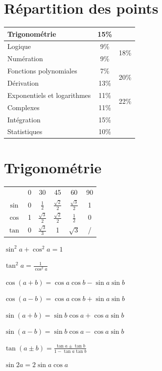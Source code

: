 \documentclass[a4paper,12pt]{article}
\begin{document}
\section*{Répartition des points}
\begin{tabular}{lcc} 
    Trigonométrie & 15\% & \\ \hline
    Logique & 9\% &  \multirow{2}{*}{18\%} \\
    Numération & 9\% & \\ \hline
    Fonctions polynomiales & 7\% &  \multirow{2}{*}{20\%} \\
    Dérivation & 13\% &  \\ \hline
     Exponentiels et logarithmes & 11\% &  \multirow{2}{*}{22\%} \\
    Complexes & 11\% &  \\ \hline
    Intégration & 15\% &  \\ \hline
    Statistiques & 10\% & \\
\end{tabular}

\newpage
\section{Trigonométrie}

\begin{tabular}{cccccc}
   & 0 & 30 & 45 & 60 & 90 \\
  $\sin$ & 0 & $\frac{1}{2}$ & $\frac{\sqrt{2}}{2}$ & $\frac{\sqrt{3}}{2}$ & 1\\
  $\cos$ & 1 & $\frac{\sqrt{3}}{2}$ & $\frac{\sqrt{2}}{2}$ & $\frac{1}{2}$ & 0 \\
  $\tan$ & 0 & $\frac{\sqrt{3}}{3}$ & 1 & $\sqrt{3}$ & / \\
\end{tabular}

\vspace{\baselineskip}
$\sin^2 a + \cos^2 a = 1$

$\tan^2a = \frac{1}{\cos^2a}$

\vspace{\baselineskip}
$\cos(a+b)= \cos a \cos b - \sin a \sin b$

$\cos(a-b)= \cos a \cos b + \sin a \sin b$

$\sin(a+b)= \sin b \cos a +  \cos a \sin b$

$\sin(a-b)= \sin b \cos a -  \cos a \sin b$

$\tan(a\pm b) = \frac{\tan a \pm \tan b}{1-\tan a \tan b}$

\vspace{\baselineskip}
$\sin 2a = 2\sin a \cos a$
\end{document}
